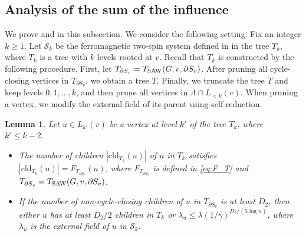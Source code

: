\documentclass[11pt]{amsart}
\def\+#1{\mathcal{#1}}
\newtheorem{lemma}[theorem]{Lemma}
\theoremstyle{definition}
\theoremstyle{remark}
\begin{document}
\subsection{Analysis of the sum of the influence}\label{subsec:analysis-of-the-sum-of-the-influence}
We prove  and  in this subsection.
We consider the following setting. Fix an integer $k \geq 1$. Let $\+S_k$ be the ferromagnetic two-spin system defined in  in the tree $T_k$, where $T_k$ is a tree with $k$ levels rooted at $v$. 
Recall that $T_k$ is constructed by the following procedure. 
First, let $T_{\partial S_v} = T_{\textnormal{SAW}}(G,v,\partial S_v)$.
After pruning all cycle-closing vertices in $T_{\partial S_v}$, we obtain a tree $T$.
Finally, we truncate the tree $T$ and keep levels $0,1,\ldots,k$, and then prune all vertices in $\Lambda \cap L_{<k}(v)$. When pruning a vertex, we modify the external field of its parent using self-reduction.
\begin{lemma}\label{lemma:property-of-vertex-in-tree-T_k}
Let $u \in L_{k'}(v)$ be a vertex at level $k'$ of the tree $T_k$, where $k'\leq k-2$. 
\begin{itemize}
    \item The number of children $|\text{cld}_{T_k}(u)|$ of $u$ in $T_k$ satisfies $|\text{cld}_{T_k}(u)| = F_{T_{\partial S_v}}(u)$, where $F_{T_{\partial S_v}}$ is defined in \eqref{eq:F_T} and $T_{\partial S_v} = T_{\textnormal{SAW}}(G,v,\partial S_v)$.
    \item If the number of non-cycle-closing children of $u$ in $T_{\partial S_v}$ is at least $D_2$, then either $u$ has at least $D_2/2$ children in $T_k$ or $\lambda_u \leq \lambda (1/\gamma)^{D_2/(5 \log n)}$, where $\lambda_u$ is the external field of $u$ in $\+S_k$.
\end{itemize}
\end{lemma}
\end{document}

